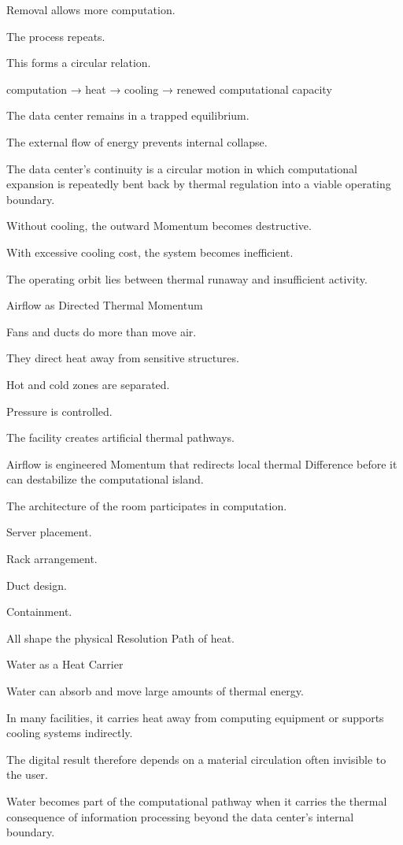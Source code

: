 Removal allows more computation.

The process repeats.

This forms a circular relation.

computation → heat → cooling → renewed computational capacity

The data center remains in a trapped equilibrium.

The external flow of energy prevents internal collapse.

The data center’s continuity is a circular motion in which computational expansion is repeatedly bent back by thermal regulation into a viable operating boundary.

Without cooling, the outward Momentum becomes destructive.

With excessive cooling cost, the system becomes inefficient.

The operating orbit lies between thermal runaway and insufficient activity.

Airflow as Directed Thermal Momentum

Fans and ducts do more than move air.

They direct heat away from sensitive structures.

Hot and cold zones are separated.

Pressure is controlled.

The facility creates artificial thermal pathways.

Airflow is engineered Momentum that redirects local thermal Difference before it can destabilize the computational island.

The architecture of the room participates in computation.

Server placement.

Rack arrangement.

Duct design.

Containment.

All shape the physical Resolution Path of heat.

Water as a Heat Carrier

Water can absorb and move large amounts of thermal energy.

In many facilities, it carries heat away from computing equipment or supports cooling systems indirectly.

The digital result therefore depends on a material circulation often invisible to the user.

Water becomes part of the computational pathway when it carries the thermal consequence of information processing beyond the data center’s internal boundary.

